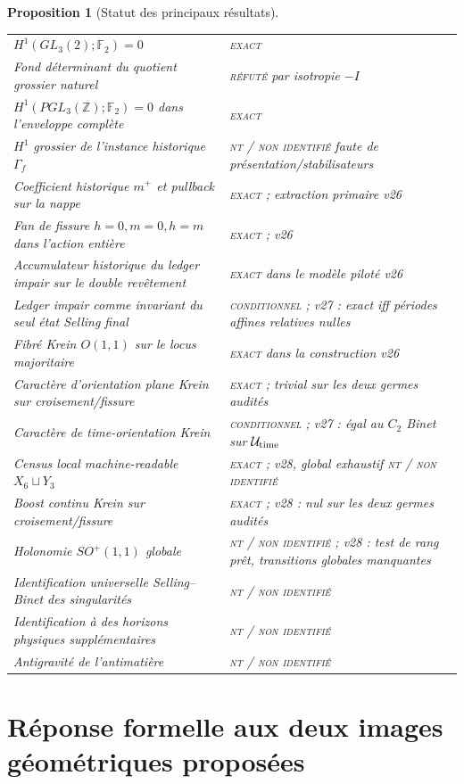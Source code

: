 \documentclass[11pt,a4paper]{article}
\newtheorem{proposition}[theorem]{Proposition}
\newcommand{\Z}{\mathbb Z}
\newcommand{\statusExact}{\textsc{exact}}
\newcommand{\statusCond}{\textsc{conditionnel}}
\newcommand{\statusNT}{\textsc{nt / non identifié}}
\begin{document}
\begin{proposition}[Statut des principaux résultats]
\begin{longtable}{@{}p{}p{}@{}}
$H^1(GL_3(2);\mathbb F_2)=0$ & \statusExact\\
Fond déterminant du quotient grossier naturel & \textsc{réfuté} par isotropie $-I$\\
$H^1(PGL_3(\Z);\mathbb F_2)=0$ dans l'enveloppe complète & \statusExact\\
$H^1$ grossier de l'instance historique $\Gamma_f$ & \statusNT{} faute de présentation/stabilisateurs\\
Coefficient historique $m^+$ et pullback sur la nappe & \statusExact{} ; extraction primaire v26\\
Fan de fissure $h=0,m=0,h=m$ dans l'action entière & \statusExact{} ; v26\\
Accumulateur historique du ledger impair sur le double revêtement & \statusExact{} dans le modèle piloté v26\\
Ledger impair comme invariant du seul état Selling final & \statusCond{} ; v27 : exact iff périodes affines relatives nulles\\
Fibré Krein $O(1,1)$ sur le locus majoritaire & \statusExact{} dans la construction v26\\
Caractère d'orientation plane Krein sur croisement/fissure & \statusExact{} ; trivial sur les deux germes audités\\
Caractère de time-orientation Krein & \statusCond{} ; v27 : égal au $C_2$ Binet sur $\mathcal U_{\rm time}$\\
Census local machine-readable $X_6\sqcup Y_3$ & \statusExact{} ; v28, global exhaustif \statusNT{}\\
Boost continu Krein sur croisement/fissure & \statusExact{} ; v28 : nul sur les deux germes audités\\
Holonomie $SO^+(1,1)$ globale & \statusNT{} ; v28 : test de rang prêt, transitions globales manquantes\\
Identification universelle Selling--Binet des singularités & \statusNT\\
Identification à des horizons physiques supplémentaires & \statusNT\\
Antigravité de l'antimatière & \statusNT\\
\bottomrule
\end{longtable}
\end{proposition}

\section{Réponse formelle aux deux images géométriques proposées}
\end{document}
